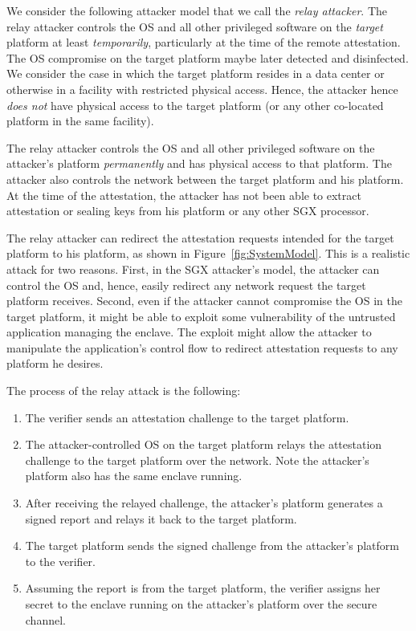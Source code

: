  We consider the following attacker model that we call the \emph{relay attacker}. The relay attacker controls the OS and all other privileged software on the \emph{target} platform at least \emph{temporarily}, particularly at the time of the remote attestation. The OS compromise on the target platform maybe later detected and disinfected. We consider the case in which the target platform resides in a data center or otherwise in a facility with restricted physical access. Hence, the attacker hence \emph{does not} have physical access to the target platform (or any other co-located platform in the same facility). %

The relay attacker controls the OS and all other privileged software on the attacker's platform \emph{permanently} and has physical access to that platform. The attacker also controls the network between the target platform and his platform. At the time of the attestation, the attacker has not been able to extract attestation or sealing keys from his platform or any other SGX processor.


 The relay attacker can redirect the attestation requests intended for the target platform to his platform, as shown in Figure~\ref{fig:SystemModel}. This is a realistic attack for two reasons. First, in the SGX attacker's model, the attacker can control the OS and, hence, easily redirect any network request the target platform receives. Second, even if the attacker cannot compromise the OS in the target platform, it might be able to exploit some vulnerability of the untrusted application managing the enclave. The exploit might allow the attacker to manipulate the application's control flow to redirect attestation requests to any platform he desires. 

The process of the relay attack is the following:

\begin{enumerate}
  \item [\one] The verifier sends an attestation challenge to the target platform.
  \item [\two] The attacker-controlled OS on the target platform relays the attestation challenge to the target platform over the network. Note the attacker's platform also has the same enclave running.
  \item [\three] After receiving the relayed challenge, the attacker's platform generates a signed report and relays it back to the target platform.
  \item [\four] The target platform sends the signed challenge from the attacker's platform to the verifier.
  \item [\five] Assuming the report is from the target platform, the verifier assigns her secret to the enclave running on the attacker's platform over the secure channel. 
\end{enumerate}



